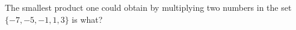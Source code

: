 The smallest product one could obtain by multiplying two numbers in the set $\{ -7, -5, -1, 1, 3 \}$ is what?
